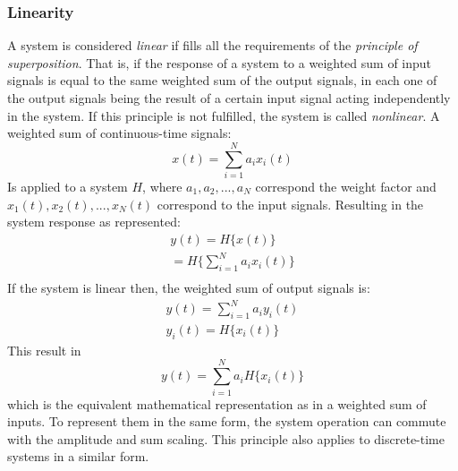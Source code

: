 \subsubsection*{Linearity}
A system is considered \textit{linear} if fills all the requirements of the \textit{principle of superposition}. That is, if the response of a system to a weighted sum of input signals is equal to the same weighted sum of the output signals, in each one of the output signals being the result of a certain input signal acting independently in the system. If this principle is not fulfilled, the system is called \textit{nonlinear}. 
A weighted sum of continuous-time signals: 
\begin{equation}
    x(t) = \sum_{i=1}^{N}a_ix_i(t)
\end{equation}
Is applied to a system $H$, where $a_1, a_2, ..., a_N$ correspond the weight factor and $x_1(t), x_2(t), ..., x_N(t)$ correspond to the input signals. Resulting in the system response as represented:
\begin{equation}
    \begin{aligned}
        y(t) = H\{x(t)\}\\
        =H\{\sum_{i=1}^{N}a_ix_i(t)\}\\
    \end{aligned}
\end{equation} 
If the system is linear then, the weighted sum of output signals is:
\begin{equation}
    \begin{aligned}
        y(t) = \sum_{i=1}^{N}a_iy_i(t)\\
        y_i(t) = H\{x_i(t)\}   
    \end{aligned}
\end{equation}
This result in
\begin{equation}
    y(t) = \sum_{i=1}^{N}a_i H\{x_i(t)\}    
\end{equation}
which is the equivalent mathematical representation as in a weighted sum of inputs. To represent them in the same form, the system operation can commute with the amplitude and sum scaling. This principle also applies to discrete-time systems in a similar form. 


